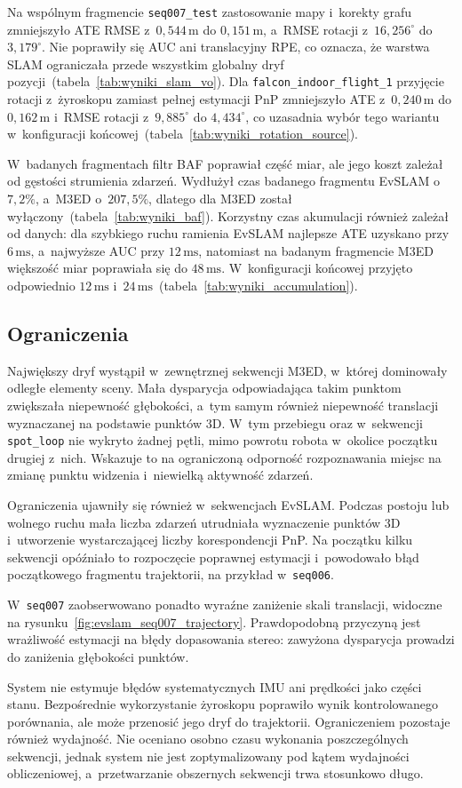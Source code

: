 Na wspólnym fragmencie \texttt{seq007\_test} zastosowanie mapy i~korekty grafu zmniejszyło ATE RMSE z~$0{,}544\,\mathrm{m}$ do $0{,}151\,\mathrm{m}$, a~RMSE rotacji z~$16{,}256^\circ$ do $3{,}179^\circ$. Nie poprawiły się AUC ani translacyjny RPE, co oznacza, że warstwa SLAM ograniczała przede wszystkim globalny dryf pozycji~(tabela~\ref{tab:wyniki_slam_vo}). Dla \texttt{falcon\_indoor\_flight\_1} przyjęcie rotacji z~żyroskopu zamiast pełnej estymacji PnP zmniejszyło ATE z~$0{,}240\,\mathrm{m}$ do $0{,}162\,\mathrm{m}$ i~RMSE rotacji z~$9{,}885^\circ$ do $4{,}434^\circ$, co uzasadnia wybór tego wariantu w~konfiguracji końcowej~(tabela~\ref{tab:wyniki_rotation_source}).

W~badanych fragmentach filtr BAF poprawiał część miar, ale jego koszt zależał od gęstości strumienia zdarzeń. Wydłużył czas badanego fragmentu EvSLAM o~$7{,}2\%$, a~M3ED o~$207{,}5\%$, dlatego dla M3ED został wyłączony~(tabela~\ref{tab:wyniki_baf}). Korzystny czas akumulacji również zależał od danych: dla szybkiego ruchu ramienia EvSLAM najlepsze ATE uzyskano przy $6\,\mathrm{ms}$, a~najwyższe AUC przy $12\,\mathrm{ms}$, natomiast na badanym fragmencie M3ED większość miar poprawiała się do $48\,\mathrm{ms}$. W~konfiguracji końcowej przyjęto odpowiednio $12\,\mathrm{ms}$ i~$24\,\mathrm{ms}$~(tabela~\ref{tab:wyniki_accumulation}).

\subsection{Ograniczenia}

Największy dryf wystąpił w~zewnętrznej sekwencji M3ED, w~której dominowały odległe elementy sceny. Mała dysparycja odpowiadająca takim punktom zwiększała niepewność głębokości, a~tym samym również niepewność translacji wyznaczanej na podstawie punktów 3D. W~tym przebiegu oraz w~sekwencji \texttt{spot\_loop} nie wykryto żadnej pętli, mimo powrotu robota w~okolice początku drugiej z~nich. Wskazuje to na ograniczoną odporność rozpoznawania miejsc na zmianę punktu widzenia i~niewielką aktywność zdarzeń.

Ograniczenia ujawniły się również w~sekwencjach EvSLAM. Podczas postoju lub wolnego ruchu mała liczba zdarzeń utrudniała wyznaczenie punktów 3D i~utworzenie wystarczającej liczby korespondencji PnP. Na początku kilku sekwencji opóźniało to rozpoczęcie poprawnej estymacji i~powodowało błąd początkowego fragmentu trajektorii, na przykład w~\texttt{seq006}.

W~\texttt{seq007} zaobserwowano ponadto wyraźne zaniżenie skali translacji, widoczne na rysunku~\ref{fig:evslam_seq007_trajectory}. Prawdopodobną przyczyną jest wrażliwość estymacji na błędy dopasowania stereo: zawyżona dysparycja prowadzi do zaniżenia głębokości punktów.

System nie estymuje błędów systematycznych IMU ani prędkości jako części stanu. Bezpośrednie wykorzystanie żyroskopu poprawiło wynik kontrolowanego porównania, ale może przenosić jego dryf do trajektorii. Ograniczeniem pozostaje również wydajność. Nie oceniano osobno czasu wykonania poszczególnych sekwencji, jednak system nie jest zoptymalizowany pod kątem wydajności obliczeniowej, a~przetwarzanie obszernych sekwencji trwa stosunkowo długo.
